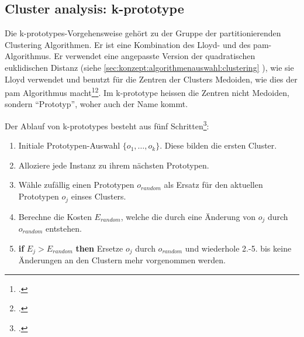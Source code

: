 %
%
%


\subsection{Cluster analysis: k-prototype}
\label{sec:recherche:algorithmen:k-prototypes}
Die k-prototypes-Vorgehensweise gehört zu der Gruppe der partitionierenden Clustering Algorithmen. Er ist eine Kombination des Lloyd- und des \gls{pam}- Algorithmus. Er verwendet eine angepasste Version der quadratischen euklidischen Distanz (siehe \cref{sec:konzept:algorithmenauswahl:clustering} ), wie sie Lloyd verwendet und benutzt für die Zentren der Clusters Medoiden, wie dies der \gls{pam} Algorithmus macht\footcite{data_mining_concepts_and_techniques}\footcite{clustering_numeric_and_categorical_values}. Im k-prototype heissen die Zentren nicht Medoiden, sondern "`Prototyp"', woher auch der Name kommt.

Der Ablauf von k-prototypes besteht aus fünf Schritten\footcite{clustering_numeric_and_categorical_values}:
\begin{enumerate}
	\item Initiale Prototypen-Auswahl $\{o_1,\ldots,o_k\}$. Diese bilden die ersten Cluster.
	\item Alloziere jede Instanz zu ihrem nächsten Prototypen.
	\item Wähle zufällig einen Prototypen $o_{random}$ als Ersatz für den aktuellen Prototypen $o_j$ einses Clusters.
	\item Berechne die Kosten $E_{random}$, welche die durch eine Änderung von $o_j$ durch $o_{random}$ entstehen.
	\item \textbf{if} $E_j > E_{random}$ \textbf{then} Ersetze $o_j$ durch $o_{random}$ und wiederhole 2.-5. bis keine Änderungen an den Clustern mehr vorgenommen werden.
\end{enumerate}

